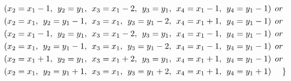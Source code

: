 \begin{appendices}
\begin{itemize}
\begin{align*}
&(x_{2} = x_{1}-1,\hspace{1ex}y_{2} = y_{1},\hspace{1ex}x_{3} = x_{1}-2,\hspace{1ex} y_{3} = y_{1},\hspace{1ex}x_{4} = x_{1}-1,\hspace{1ex}y_{4} = y_{1}-1)\hspace{1ex} or\\
&(x_{2} = x_{1},\hspace{1ex}y_{2} = y_{1}-1,\hspace{1ex}x_{3} = x_{1}, \hspace{1ex}y_{3} = y_{1}-2,\hspace{1ex}x_{4} = x_{1}+1,\hspace{1ex}y_{4} = y_{1}-1)\hspace{1ex} or\\
&(x_{2} = x_{1}-1,\hspace{1ex}y_{2} = y_{1},\hspace{1ex}x_{3} = x_{1}-2, \hspace{1ex}y_{3} = y_{1},\hspace{1ex}x_{4} = x_{1}-1,\hspace{1ex}y_{4} = y_{1}-1)\hspace{1ex} or\\
&(x_{2} = x_{1},\hspace{1ex}y_{2} = y_{1}-1,\hspace{1ex}x_{3} = x_{1}, \hspace{1ex}y_{3} = y_{1}-2,\hspace{1ex}x_{4} = x_{1}-1,\hspace{1ex}y_{4} = y_{1}-1)\hspace{1ex} or\\
&(x_{2} = x_{1}+1,\hspace{1ex}y_{2} = y_{1},\hspace{1ex}x_{3} = x_{1}+2, \hspace{1ex}y_{3} = y_{1},\hspace{1ex}x_{4} = x_{1}+1,\hspace{1ex}y_{4} = y_{1}-1)\hspace{1ex} or\\
&(x_{2} = x_{1},\hspace{1ex}y_{2} = y_{1}+1,\hspace{1ex}x_{3} = x_{1}, \hspace{1ex}y_{3} = y_{1}+2,\hspace{1ex}x_{4} = x_{1}+1,\hspace{1ex}y_{4} = y_{1}+1)\hspace{3ex} \}

\end{align*}
\end{itemize}
\end{appendices}
